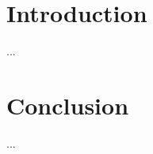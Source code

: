 \documentclass[
  realfonts,
]{maps}
\begin{document}
\maketitle
\section{Introduction}
...
\section{Conclusion}
...
\end{document}
